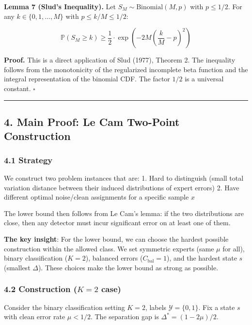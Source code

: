 \documentclass[
  12pt,
]{ctexart}
\begin{document}
\textbf{Lemma 7 (Slud's Inequality).} Let
\(S_M \sim \text{Binomial}(M, p)\) with \(p \leq 1/2\). For any
\(k \in \{0,1,\dots,M\}\) with \(p \leq k/M \leq 1/2\):

\[\mathbb{P}(S_M \geq k) \geq \frac{1}{2} \cdot \exp\!\left(-2M\left(\frac{k}{M} - p\right)^2\right)\]

\textbf{Proof.} This is a direct application of Slud (1977), Theorem 2.
The inequality follows from the monotonicity of the regularized
incomplete beta function and the integral representation of the binomial
CDF. The factor \(1/2\) is a universal constant. \(\square\)

\begin{center}\rule{0.5\linewidth}{0.5pt}\end{center}

\subsection{4. Main Proof: Le Cam Two-Point
Construction}\label{main-proof-le-cam-two-point-construction}

\subsubsection{4.1 Strategy}\label{strategy}

We construct two problem instances that are: 1. Hard to distinguish
(small total variation distance between their induced distributions of
expert errors) 2. Have different optimal noise/clean assignments for a
specific sample \(x\)

The lower bound then follows from Le Cam's lemma: if the two
distributions are close, then any detector must incur significant error
on at least one of them.

\textbf{The key insight}: For the lower bound, we can choose the hardest
possible construction within the allowed class. We set symmetric experts
(same \(\mu\) for all), binary classification (\(K=2\)), balanced errors
(\(C_{\text{bal}} = 1\)), and the hardest state \(s\) (smallest
\(\Delta\)). These choices make the lower bound as strong as possible.

\subsubsection{\texorpdfstring{4.2 Construction (\(K=2\)
case)}{4.2 Construction (K=2 case)}}\label{construction-k2-case}

Consider the binary classification setting \(K=2\), labels
\(\mathcal{Y} = \{0,1\}\). Fix a state \(s\) with clean error rate
\(\mu < 1/2\). The separation gap is \(\Delta^* = (1-2\mu)/2\).
\end{document}
